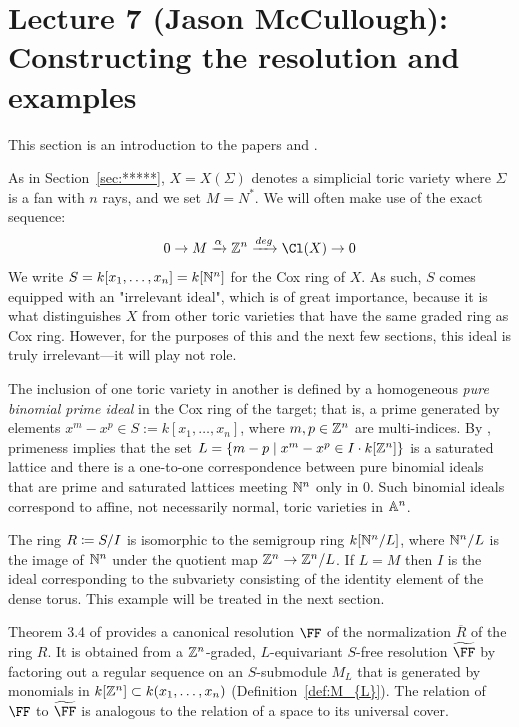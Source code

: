 \documentclass{amsart}
\begin{document}
\fi
\def\tF{{\widetilde \FF}}
\def\BT{{Bondal-Thomsen\ }}

\section{Lecture 7 (Jason McCullough): Constructing the resolution and examples}\label{lec:7-HHL-construction}
This section is an introduction to the papers \cite{BCHSY} and \cite{BH25}.

As in Section~\ref{sec:*****}, $X = X(\Sigma)$ denotes a simplicial toric variety where $\Sigma$ is a fan with $n$ rays, and we set $M = N^{*}$. We will often make use of the exact sequence:
$$
0\to M \xrightarrow {\alpha} \ZZ^{n} \xrightarrow {deg} \Cl(X) \to 0
$$
We write $S = k[x_{1},\dots,x_{n}]= k[\NN^{n}]$ for the Cox ring of $X$. As such, $S$ comes equipped with an "irrelevant ideal", which is of great importance, because it is what distinguishes $X$ from other
toric varieties that have the same graded ring as Cox ring. However, for the purposes of this and the next few sections, this ideal is truly irrelevant---it will play not role.


The inclusion of one toric variety in another is defined by a 
homogeneous \emph{pure binomial prime ideal}
in the Cox ring of the target; that is, a prime generated by elements $x^m-x^p \in S := k[x_1,\dots, x_n]$, where $m,p\in\ZZ^n$ are multi-indices. By \cite{Eisenbud-Sturmfels}, primeness implies that
the set $L = \{m-p\mid x^m-x^p\in I \cdot k[\ZZ^n]\}$ is a saturated lattice and there is a one-to-one correspondence between pure binomial ideals that are prime and saturated lattices meeting
 $\NN^n$ only in 0. Such binomial ideals correspond to affine, not necessarily normal, toric varieties in $\AA^{n}$. 
 
 The ring $R \ce S/I$ is isomorphic to the semigroup ring $k[\NN^n/L]$, where $\NN^n/L$ is the image of $\NN^n$ under the quotient map $\ZZ^n\rightarrow \ZZ^n/L$.
 If $L = M $ then $I$ is the ideal corresponding to the subvariety consisting of the identity element of the dense torus. This example will be treated in the next section.


Theorem 3.4 of \cite{BCHSY} provides a canonical  resolution $\FF$ of the normalization $\overline R$
of the ring $R$. It is obtained from a $\ZZ^{n}$-graded, $L$-equivariant $S$-free resolution $\tF$ by factoring out a regular sequence on
an $S$-submodule $M_L$ that is generated by monomials in $k[\ZZ^n] \subset k(x_{1}, \dots, x_{n})$ (Definition~\ref{def:M_{L}}).
The relation of $\FF$ to $\tF$ is analogous to the relation of a space to its universal cover.
\end{document}
